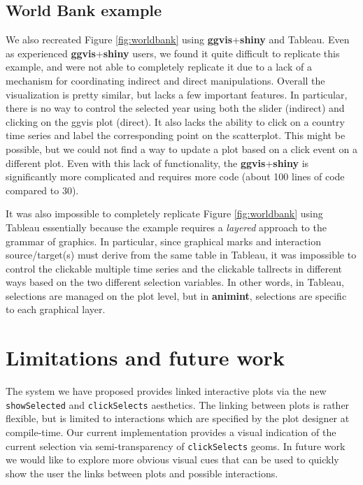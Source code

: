 \documentclass[12pt,]{article}
\theoremstyle{definition}
\theoremstyle{definition}
\theoremstyle{definition}
\theoremstyle{remark}
\begin{document}
\hypertarget{world-bank-example}{%
\subsection{World Bank example}\label{world-bank-example}}

We also recreated Figure \ref{fig:worldbank} using
\textbf{ggvis}+\textbf{shiny} and Tableau. Even as experienced
\textbf{ggvis}+\textbf{shiny} users, we found it quite difficult to
replicate this example, and were not able to completely replicate it due
to a lack of a mechanism for coordinating indirect and direct
manipulations. Overall the visualization is pretty similar, but lacks a
few important features. In particular, there is no way to control the
selected year using both the slider (indirect) and clicking on the ggvis
plot (direct). It also lacks the ability to click on a country time
series and label the corresponding point on the scatterplot. This might
be possible, but we could not find a way to update a plot based on a
click event on a different plot. Even with this lack of functionality,
the \textbf{ggvis}+\textbf{shiny} is significantly more complicated and
requires more code (about 100 lines of code compared to 30).

It was also impossible to completely replicate Figure
\ref{fig:worldbank} using Tableau essentially because the example
requires a \emph{layered} approach to the grammar of graphics. In
particular, since graphical marks and interaction source/target(s) must
derive from the same table in Tableau, it was impossible to control the
clickable multiple time series and the clickable tallrects in different
ways based on the two different selection variables. In other words, in
Tableau, selections are managed on the plot level, but in
\textbf{animint}, selections are specific to each graphical layer.

\hypertarget{limitations}{%
\section{Limitations and future work}\label{limitations}}

The system we have proposed provides linked interactive plots via the
new \texttt{showSelected} and \texttt{clickSelects} aesthetics. The
linking between plots is rather flexible, but is limited to interactions
which are specified by the plot designer at compile-time. Our current
implementation provides a visual indication of the current selection via
semi-transparency of \texttt{clickSelects} geoms. In future work we
would like to explore more obvious visual cues that can be used to
quickly show the user the links between plots and possible interactions.
\end{document}
